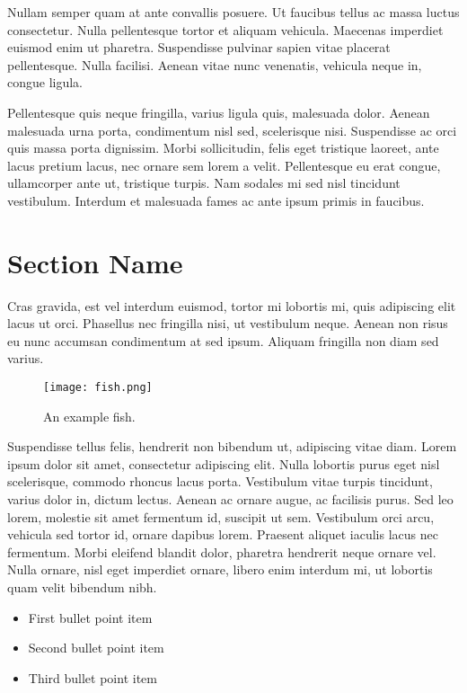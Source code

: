 \documentclass[
  UTF8, %
  12pt, %
]{essay}
\begin{document}
Nullam semper quam at ante convallis posuere. Ut faucibus tellus ac massa luctus consectetur. Nulla pellentesque tortor et aliquam vehicula. Maecenas imperdiet euismod enim ut pharetra. Suspendisse pulvinar sapien vitae placerat pellentesque. Nulla facilisi. Aenean vitae nunc venenatis, vehicula neque in, congue ligula.

Pellentesque quis neque fringilla, varius ligula quis, malesuada dolor. Aenean malesuada urna porta, condimentum nisl sed, scelerisque nisi. Suspendisse ac orci quis massa porta dignissim. Morbi sollicitudin, felis eget tristique laoreet, ante lacus pretium lacus, nec ornare sem lorem a velit. Pellentesque eu erat congue, ullamcorper ante ut, tristique turpis. Nam sodales mi sed nisl tincidunt vestibulum. Interdum et malesuada fames ac ante ipsum primis in faucibus.


\section*{Section Name}

Cras gravida, est vel interdum euismod, tortor mi lobortis mi, quis adipiscing elit lacus ut orci. Phasellus nec fringilla nisi, ut vestibulum neque. Aenean non risus eu nunc accumsan condimentum at sed ipsum. Aliquam fringilla non diam sed varius.

\begin{wrapfigure}{l}{0.42\textwidth} %
  \texttt{[image: fish.png]}
  \caption{An example fish.}
\end{wrapfigure}
Suspendisse tellus felis, hendrerit non bibendum ut, adipiscing vitae diam. Lorem ipsum dolor sit amet, consectetur adipiscing elit. Nulla lobortis purus eget nisl scelerisque, commodo rhoncus lacus porta. Vestibulum vitae turpis tincidunt, varius dolor in, dictum lectus. Aenean ac ornare augue, ac facilisis purus. Sed leo lorem, molestie sit amet fermentum id, suscipit ut sem. Vestibulum orci arcu, vehicula sed tortor id, ornare dapibus lorem. Praesent aliquet iaculis lacus nec fermentum. Morbi eleifend blandit dolor, pharetra hendrerit neque ornare vel. Nulla ornare, nisl eget imperdiet ornare, libero enim interdum mi, ut lobortis quam velit bibendum nibh.

\begin{itemize}
  \item First bullet point item
  \item Second bullet point item
  \item Third bullet point item
\end{itemize}
\end{document}
